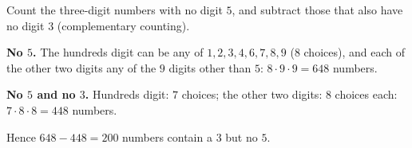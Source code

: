 Count the three-digit numbers with no digit $5$, and subtract those that also have no digit $3$ (complementary counting).

\textbf{No $5$.} The hundreds digit can be any of $1,2,3,4,6,7,8,9$ ($8$ choices), and each of the other two digits any of the $9$ digits other than $5$: $8\cdot9\cdot9=648$ numbers.

\textbf{No $5$ and no $3$.} Hundreds digit: $7$ choices; the other two digits: $8$ choices each: $7\cdot8\cdot8=448$ numbers.

Hence $648-448=\boxed{200}$ numbers contain a $3$ but no $5$.
